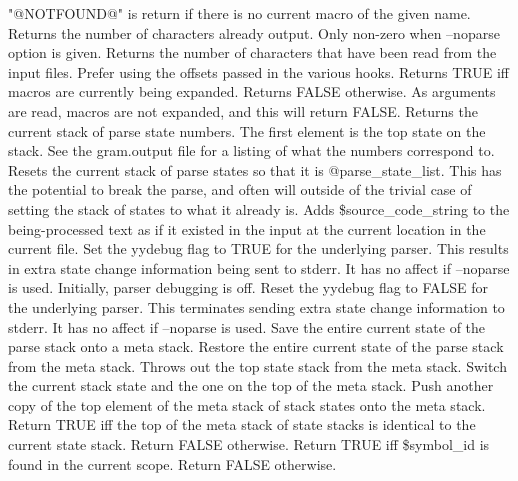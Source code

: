 "@NOTFOUND@" is return if there is no current macro of the given name.
Returns the number of characters already output.  Only non-zero when 
--noparse option is given.
Returns the number of characters that have been read from the
input files.  Prefer using the offsets passed in the various hooks.
Returns TRUE iff macros are currently being expanded.
Returns FALSE otherwise.  As arguments are read, macros are not expanded,
and this will return FALSE.
Returns the current stack of parse state numbers.  The first element is
the top state on the stack.  See the gram.output
file for a listing of what the numbers correspond to.
Resets the current stack of parse states so that it is @parse\_\-state\_\-list.
This has the potential to break the parse, and often will outside
of the trivial case of setting the stack of states to what it already is.
Adds \$source\_\-code\_\-string to the being-processed text 
as if it existed in the input at the
current location in the current file.
Set the yydebug flag to TRUE for the underlying parser.
This results in extra state change information being sent to stderr.
It has no affect if --noparse is used.  Initially, parser debugging is off.
Reset the yydebug flag to FALSE for the underlying parser.  
This terminates sending extra state change information to stderr.
It has no affect if --noparse is used.
Save the entire current state of the parse stack onto a meta stack.
Restore the entire current state of the parse stack from the meta stack.
Throws out the top state stack from the meta stack.
Switch the current stack state and the one on the top of the meta stack.
Push another copy of the top element of the meta stack of stack states onto
the meta stack.
Return TRUE iff the top of the meta stack of state stacks is
identical to the current state stack. Return FALSE otherwise.
Return TRUE iff \$symbol\_\-id is found in the current scope.
Return FALSE otherwise.

